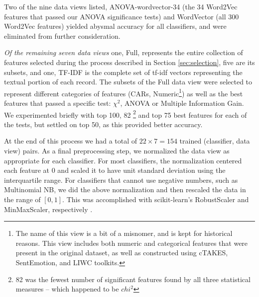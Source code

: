 Two of the nine data views listed, 
\textsf{ANOVA-wordvector-34} (the 34 \textsf{Word2Vec} features that
passed our ANOVA significance tests) and \textsf{WordVector}
(all 300 \textsf{Word2Vec} features) yielded abysmal accuracy for
all classifiers, and were eliminated from further consideration.

\textit{Of the remaining seven data views} one, \textsf{Full}, represents 
the entire collection of features selected during
the process described in Section \ref{sec:selection}, five are its subsets,
and one, \textsf{TF-IDF} is the complete set of tf-idf vectors
representing the textual portion of each record. The subsets
of the \textsf{Full} data view were selected to represent different categories
of features (\textsf{CARs}, \textsf{Numeric}\footnote{The name
of this view is a bit of a misnomer, and is kept for historical reasons.
This view includes both numeric and categorical features that
were present in the original dataset, as well as constructed
using \textsf{cTAKES}, SentEmotion, and \textsf{LIWC} toolkits.}) as well
as the best features that passed a specific test: $\chi^2$, ANOVA or Multiple
Information Gain. We experimented briefly with top 100, 82 \footnote{82 was the fewest number of significant features found by all three statistical measures -- which happened to be $chi^2$} and top 75 best features
for each of the tests, but settled on top 50, as this provided better accuracy.

At the end of this process we had a total of $22\times 7 = 154$
trained (classifier, data view) pairs. As a final preprocessing step, we normalized the data view as appropriate for each classifier. For most classifiers, the normalization centered each feature at 0 and scaled it to have unit standard deviation using the interquartile range. For classifiers that cannot use negative numbers, such as Multinomial NB, we did the above normalization and then rescaled the data in the range of $[0, 1]$. This was accomplished with \textsf{scikit-learn}'s \textsf{RobustScaler} and \textsf{MinMaxScaler}, respectively \cite{scikit-learn}. 


